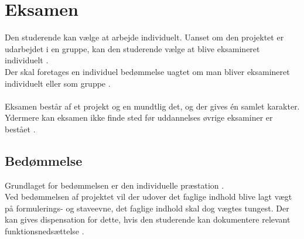 \documentclass[a4paper]{article}
\begin{document}
\section{Eksamen}
Den studerende kan vælge at arbejde individuelt. Uanset om den projektet er udarbejdet i en gruppe, kan den studerende vælge at blive eksamineret individuelt \cite[§ 13]{eksamen}.\\
Der skal foretages en individuel bedømmelse uagtet om man bliver eksamineret individuelt eller som gruppe \cite[§ 13, stk. 2]{eksamen}.\\\\
Eksamen består af et projekt og en mundtlig det, og der gives én samlet karakter. Ydermere kan eksamen ikke finde sted før uddannelses øvrige eksaminer er bestået \cite[§ 15, stk. 1, nr. 3]{eksamen}.

\subsection{Bedømmelse}
Grundlaget for bedømmelsen er den individuelle præstation \cite[§ 37]{eksamen}.\\
Ved bedømmelsen af projektet vil der udover det faglige indhold blive lagt vægt på formulerings- og staveevne, det faglige indhold skal dog vægtes tungest. Der kan gives dispensation for dette, hvis den studerende kan dokumentere relevant funktionsnedsættelse \cite[§ 37, stk. 4]{eksamen}.
\end{document}
